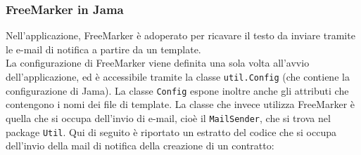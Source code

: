 \subsubsection{FreeMarker in Jama}
Nell'applicazione, FreeMarker è adoperato per ricavare il testo da inviare tramite le e-mail di notifica a partire da un template.\\
La configurazione di FreeMarker viene definita una sola volta all'avvio dell'applicazione, ed è accessibile tramite la classe \lstinline{util.Config} (che contiene la configurazione di Jama). La classe \lstinline{Config} espone inoltre anche gli attributi che contengono i nomi dei file di template.
La classe che invece utilizza FreeMarker è quella che si occupa dell'invio di e-mail, cioè il \lstinline{MailSender}, che si trova nel package \lstinline{Util}. Qui di seguito è riportato un estratto del codice che si occupa dell'invio della mail di notifica della creazione di un contratto:

